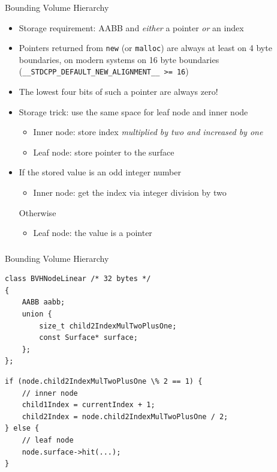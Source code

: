 \documentclass[utf8,stillsansserifmath,fleqn,t]{beamer}
\newcommand{\code}[1]{\texttt{#1}}
\begin{document}
\begin{frame}[label=bvh-2]
\begin{minipage}{.49\textwidth}
\end{minipage}
\end{frame}

\begin{frame}
\frametitle{\insertsection}
Bounding Volume Hierarchy
\begin{itemize}
\item Storage requirement: AABB and \emph{either} a pointer \emph{or} an index
\item Pointers returned from \code{new} (or \code{malloc}) are always
at least on 4 byte boundaries, on modern systems on 16 byte boundaries\\
(\code{\_\_STDCPP\_DEFAULT\_NEW\_ALIGNMENT\_\_ >= 16})
\item The lowest four bits of such a pointer are always zero!
\item Storage trick: use the same space for leaf node and inner node
    \begin{itemize}
    \item Inner node: store index \emph{multiplied by two and increased by
    one}
    \item Leaf node: store pointer to the surface
    \end{itemize}
\item If the stored value is an odd integer number
    \begin{itemize}
    \item Inner node: get the index via integer division by two
    \end{itemize}
    Otherwise
    \begin{itemize}
    \item Leaf node: the value is a pointer
    \end{itemize}
\end{itemize}
\end{frame}

\begin{frame}[fragile]
\frametitle{\insertsection}
Bounding Volume Hierarchy
\begin{lstlisting}
class BVHNodeLinear /* 32 bytes */
{
    AABB aabb;
    union {
        size_t child2IndexMulTwoPlusOne;
        const Surface* surface;
    };
};
\end{lstlisting}
\begin{lstlisting}
if (node.child2IndexMulTwoPlusOne \% 2 == 1) {
    // inner node
    child1Index = currentIndex + 1;
    child2Index = node.child2IndexMulTwoPlusOne / 2;
} else {
    // leaf node
    node.surface->hit(...);
}
\end{lstlisting}
\end{frame}
\end{document}
